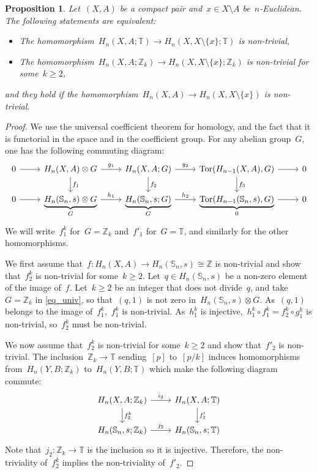 \documentclass[english,11pt]{article}
\theoremstyle{plain}
\newtheorem{proposition}{Proposition}[section]
\theoremstyle{remark}
\theoremstyle{definition}
\newcommand{\Sp}{\mathbb{S}}
\newcommand{\R}{\mathbb{R}}
\newcommand{\Z}{\mathbb{Z}}
\newcommand{\RZ}{\mathbb{T}}%
\newcommand{\Tor}{\mathop{\mathrm{Tor}}}
\begin{document}
\begin{proposition}\label{prop_coefficients}
Let~$(X,A)$ be a compact pair and~$x\in X\setminus A$ be~$n$-Euclidean. The following statements are equivalent:
\begin{itemize}
\item The homomorphism~$H_n(X,A;\RZ)\to H_n(X,X\setminus\{x\};\RZ)$ is non-trivial,
\item The homomorphism~$H_n(X,A;\Z_k)\to H_n(X,X\setminus\{x\};\Z_k)$ is non-trivial for some~$k\geq 2$,
\end{itemize}
and they hold if the homomorphism~$H_n(X,A)\to H_n(X,X\setminus\{x\})$ is non-trivial.
\end{proposition}
\begin{proof}
We use the universal coefficient theorem for homology, and the fact that it is functorial in the space and in the coefficient group. For any abelian group~$G$, one has the following commuting diagram:
\begin{equation}\label{eq_univ}
\begin{tikzcd}
0 \arrow{r} & H_n(X,A)\otimes G \arrow{r}{g_1} \arrow{d}{f_1} & H_n(X,A;G) \arrow{r}{g_2} \arrow{d}{f_2} & \Tor(H_{n-1}(X,A),G) \arrow[r] \arrow{d}{f_3} & 0\\
0 \arrow[r]  & \underbrace{H_n(\Sp_n,s)\otimes G}_G \arrow{r}{h_1}  & \underbrace{H_n(\Sp_n,s;G)}_G \arrow{r}{h_2}  & \underbrace{\Tor(H_{n-1}(\Sp_n,s),G)}_0 \arrow[r] & 0
\end{tikzcd}
\end{equation}
We will write~$f^k_1$ for~$G=\Z_k$ and~$f'_1$ for~$G=\RZ$, and similarly for the other homomorphisms.

We first assume that~$f:H_n(X,A)\to H_n(\Sp_n,s)\cong \Z$ is non-trivial and show that~$f^k_2$ is non-trivial for some~$k\geq 2$. Let~$q\in H_n(\Sp_n,s)$ be a non-zero element of the image of~$f$. Let~$k\geq 2$ be an integer that does not divide~$q$, and take~$G=\Z_k$ in \eqref{eq_univ}, so that~$(q,1)$ is not zero in~$H_n(\Sp_n,s)\otimes G$. As~$(q,1)$ belongs to the image of~$f^k_1$,~$f^k_1$ is non-trivial. As~$h^k_1$ is injective,~$h^k_1\circ f^k_1=f^k_2\circ g^k_1$ is non-trivial, so~$f^k_2$ must be non-trivial.

We now assume that~$f_2^k$ is non-trivial for some~$k\geq 2$ and show that~$f'_2$ is non-trivial. The inclusion~$\Z_k\to\RZ$ sending~$[p]$ to~$[p/k]$ induces homomorphisms from~$H_n(Y,B;\Z_k)$ to~$H_n(Y,B;\RZ)$ which make the following diagram commute:
\begin{equation}\label{eq_univ3}
\begin{tikzcd}
H_n(X,A;\Z_k) \arrow{r}{i_2} \arrow{d}{f^k_2} & H_n(X,A;\RZ) \arrow{d}{f'_2}\\
H_n(\Sp_n,s;\Z_k) \arrow{r}{j_2}   & H_n(\Sp_n,s;\RZ)
\end{tikzcd}
\end{equation}
Note that~$j_2:\Z_k\to\RZ$ is the inclusion so it is injective. Therefore, the non-triviality of~$f^k_2$ implies the non-triviality of~$f'_2$.


\end{proof}
\end{document}

